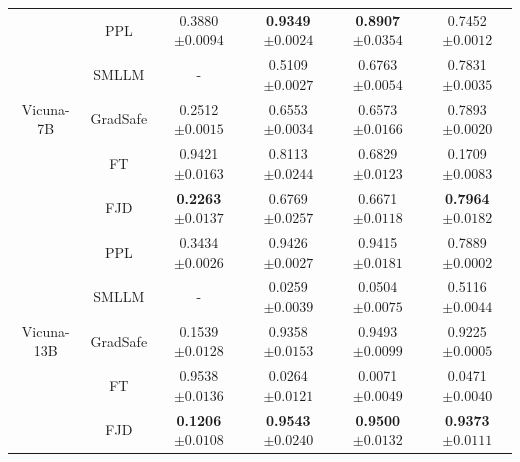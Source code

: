 \documentclass{article}
\begin{document}
\begin{table}[t]
\begin{tabular}{cccccc}
    
    \midrule
    \multirow{5}{*}{Vicuna-7B} 
    & PPL & 0.3880\tiny{$\pm 0.0094$} & \textbf{0.9349}\tiny{$\pm 0.0024$} & \textbf{0.8907}\tiny{$\pm 0.0354$} & 0.7452\tiny{$\pm 0.0012$}    \\
    & SMLLM & - & 0.5109\tiny{$\pm 0.0027$} & 0.6763\tiny{$\pm 0.0054$} & 0.7831\tiny{$\pm 0.0035$}   \\
    & GradSafe & 0.2512\tiny{$\pm 0.0015$} & 0.6553\tiny{$\pm 0.0034$} & 0.6573\tiny{$\pm 0.0166$} & 0.7893\tiny{$\pm 0.0020$}   \\
    & FT & 0.9421\tiny{$\pm 0.0163$} & 0.8113\tiny{$\pm 0.0244$} & 0.6829\tiny{$\pm 0.0123$} & 0.1709\tiny{$\pm 0.0083$}   \\
    & FJD & \textbf{0.2263}\tiny{$\pm 0.0137$} & 0.6769\tiny{$\pm 0.0257$} & 0.6671\tiny{$\pm 0.0118$} & \textbf{0.7964}\tiny{$\pm 0.0182$}    \\ 
    \midrule
    \multirow{5}{*}{Vicuna-13B} 
    & PPL  & 0.3434\tiny{$\pm 0.0026$} & 0.9426\tiny{$\pm 0.0027$} & 0.9415\tiny{$\pm 0.0181$} & 0.7889\tiny{$\pm 0.0002$}   \\
    & SMLLM & - & 0.0259\tiny{$\pm 0.0039$} & 0.0504\tiny{$\pm 0.0075$} & 0.5116\tiny{$\pm 0.0044$}    \\
    & GradSafe & 0.1539\tiny{$\pm 0.0128$} & 0.9358\tiny{$\pm 0.0153$} & 0.9493\tiny{$\pm 0.0099$} & 0.9225\tiny{$\pm 0.0005$}   \\
    & FT & 0.9538\tiny{$\pm 0.0136$} & 0.0264\tiny{$\pm 0.0121$} & 0.0071\tiny{$\pm 0.0049$} & 0.0471\tiny{$\pm 0.0040$}    \\
    & FJD & \textbf{0.1206}\tiny{$\pm 0.0108$} & \textbf{0.9543}\tiny{$\pm 0.0240$} & \textbf{0.9500}\tiny{$\pm 0.0132$} & \textbf{0.9373}\tiny{$\pm 0.0111$}    \\
    

\end{tabular}
\end{table}
\end{document}
